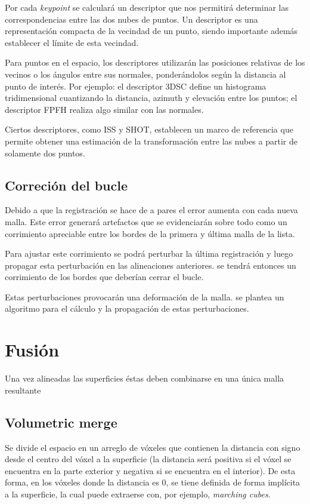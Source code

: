 \documentclass{pfc}
\begin{document}
			Por cada \emph{keypoint} se calculará un descriptor que nos
			permitirá determinar las correspondencias entre las dos nubes de
			puntos.
			Un descriptor es una representación compacta
			de la vecindad de un punto,
			siendo importante además establecer el límite de esta vecindad.

			Para puntos en el espacio, los descriptores utilizarán las
			posiciones relativas de los vecinos o los ángulos entre sus
			normales, ponderándolos según la distancia al punto de interés.
			Por ejemplo: el descriptor 3DSC define un histograma tridimensional
			cuantizando la distancia, azimuth y elevación entre los puntos;
			el descriptor FPFH realiza algo similar con las normales.

			Ciertos descriptores, como ISS y SHOT, establecen un marco de
			referencia que permite obtener una estimación de la transformación
			entre las nubes a partir de solamente dos puntos.

		\subsection{Correción del bucle}
			Debido a que la registración se hace de a pares el error aumenta
			con cada nueva malla.
			Este error generará artefactos que se evidenciarán sobre todo como
			un corrimiento apreciable entre los bordes de la primera y última
			malla de la lista.

			Para ajustar este corrimiento se podrá perturbar la última
			registración y luego propagar esta perturbación en las alineaciones
			anteriores.
			se tendrá entonces un corrimiento de los
			bordes que deberían cerrar el bucle.

			Estas perturbaciones provocarán una deformación de la malla.
			se plantea un algoritmo para el cálculo
			y la propagación de estas perturbaciones.\cite{5457479}

	\section{Fusión}
		Una vez alineadas las superficies éstas deben combinarse en una única malla resultante

		\subsection{Volumetric merge}
		Se divide el espacio en un arreglo de vóxeles que contienen la
		distancia con signo desde el centro del vóxel a la superficie (la
		distancia será positiva si el vóxel se encuentra en la parte exterior y
		negativa si se encuentra en el interior). De esta forma, en los vóxeles
		donde la distancia es 0, se tiene definida de forma implícita a la
		superficie, la cual puede extraerse con, por ejemplo, \emph{marching cubes}.
\end{document}
